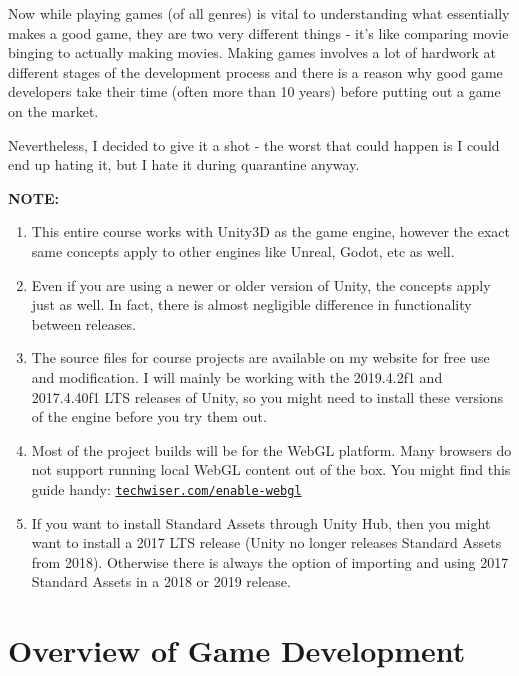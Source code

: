 \documentclass{article}[a4paper,12pt]
\theoremstyle{definition}
\begin{document}
Now while playing games (of all genres) is vital to understanding what essentially makes a good game, they are two very different things - it's like comparing movie binging to actually making movies. Making games involves a lot of hardwork at different stages of the development process and there is a reason why good game developers take their time (often more than 10 years) before putting out a game on the market.
\vspace{12pt}

Nevertheless, I decided to give it a shot - the worst that could happen is I could end up hating it, but I hate it during quarantine anyway.

\hrulefill
\vspace{6pt}

\textbf{NOTE:} 
\begin{enumerate}
	\item This entire course works with Unity3D as the game engine, however the exact same concepts apply to other engines like Unreal, Godot, etc as well.
	\item Even if you are using a newer or older version of Unity, the concepts apply just as well. In fact, there is almost negligible difference in functionality between releases.
	\item The source files for course projects are available on my website for free use and modification. I will mainly be working with the 2019.4.2f1 and 2017.4.40f1 LTS releases of Unity, so you might need to install these versions of the engine before you try them out.
	\item Most of the project builds will be for the WebGL platform. Many browsers do not support running local WebGL content out of the box. You might find this guide handy: \texttt{\href{techwiser.com/enable-webgl}{techwiser.com/enable-webgl}}
	\item If you want to install Standard Assets through Unity Hub, then you might want to install a 2017 LTS release (Unity no longer releases Standard Assets from 2018). Otherwise there is always the option of importing and using 2017 Standard Assets in a 2018 or 2019 release.
\end{enumerate}
\hrulefill
\pagebreak

\section{Overview of Game Development}
\end{document}

